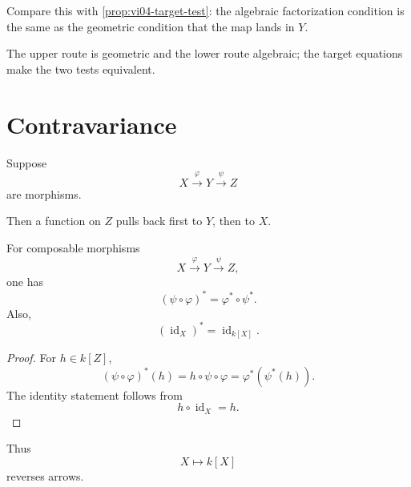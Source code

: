 Compare this with \cref{prop:vi04-target-test}: the algebraic factorization condition is
the same as the geometric condition that the map lands in \(Y\).

\begin{center}
\end{center}
The upper route is geometric and the lower route algebraic; the target equations make the two tests equivalent.

\section{Contravariance}

Suppose
\[
X\xrightarrow{\varphi}Y\xrightarrow{\psi}Z
\]
are morphisms.

Then a function on \(Z\) pulls back first to \(Y\), then to \(X\).

\begin{theorem}
\label{thm:vi04-contravariance}
For composable morphisms
\[
X\xrightarrow{\varphi}Y\xrightarrow{\psi}Z,
\]
one has
\[
(\psi\circ\varphi)^\ast
=
\varphi^\ast\circ\psi^\ast.
\]
Also,
\[
(\operatorname{id}_X)^\ast
=
\operatorname{id}_{k[X]}.
\]
\end{theorem}

\begin{proof}
For \(h\in k[Z]\),
\[
(\psi\circ\varphi)^\ast(h)
=
h\circ\psi\circ\varphi
=
\varphi^\ast(\psi^\ast(h)).
\]
The identity statement follows from
\[
h\circ\operatorname{id}_X=h.
\]
\end{proof}

Thus
\[
X\longmapsto k[X]
\]
reverses arrows.

